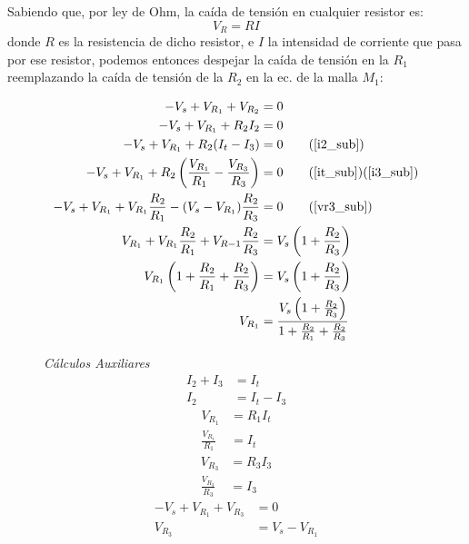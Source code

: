 \documentclass[a4paper,12pt, spanish]{report}
\begin{document}
      Sabiendo que, por ley de Ohm, la caída de tensión en cualquier resistor es:
      \begin{equation}
        V_R = R I
      \end{equation}
      donde $R$ es la resistencia de dicho resistor, e $I$ la intensidad de corriente que pasa por ese resistor,
      podemos entonces despejar la caída de tensión en la $R_1$ reemplazando la caída de tensión de la $R_2$ en la ec.
      de la malla $M_1$:
      \begin{figure}[!h]
        \centering
        \begin{minipage}{0.6\textwidth}
          \centering
          \begin{align*}
            -V_s + V_{R_1} + V_{R_2} &= 0\\
            -V_s + V_{R_1} + R_2 I_2 &= 0\\
            -V_s + V_{R_1} + R_2 (I_t - I_3) &= 0\tag*{\hfill(\ref{i2_sub})}\\
            -V_s + V_{R_1} + R_2 \left(\frac{V_{R_1}}{R_1} - \frac{V_{R_3}}{R_3}\right) &= 0\tag*{\hfill(\ref{it_sub})(\ref{i3_sub})}\\
            -V_s + V_{R_1} + V_{R_1} \frac{R_2}{R_1} - (V_s - V_{R_1}) \frac{R_2}{R_3} &= 0\tag*{\hfill(\ref{vr3_sub})}\\
            V_{R_1} + V_{R_1} \frac{R_2}{R_1} + V_{R-1} \frac{R_2}{R_3} &= V_s \left(1 + \frac{R_2}{R_3}\right)\\
            V_{R_1} \left(1 + \frac{R_2}{R_1} + \frac{R_2}{R_3}\right) &= V_s \left(1 + \frac{R_2}{R_3}\right)\\
            V_{R_1} &= \frac{V_s \left(1 + \frac{R_2}{R_3}\right)}{1 + \frac{R_2}{R_1} + \frac{R_2}{R_3}}
          \end{align*}
        \end{minipage}
        \vline
        \centering
        \begin{minipage}{0.35\textwidth}
          \centering
          \textit{Cálculos Auxiliares}
          \begin{align}
            I_2 + I_3 &= I_t\nonumber\\
            I_2 &= I_t - I_3\tag{a}
            \label{i2_sub}
          \end{align}
          \begin{align}
            V_{R_1} &= R_1 I_t\nonumber\\
            \frac{V_{R_1}}{R_1} &= I_t\tag{b}
            \label{it_sub}
          \end{align}
          \begin{align}
            V_{R_3} &= R_3 I_3\nonumber\\
            \frac{V_{R_3}}{R_3} &= I_3\tag{c}
            \label{i3_sub}
          \end{align}
          \begin{align}
            -V_s + V_{R_1} + V_{R_3} &= 0\nonumber\\
            V_{R_3} &= V_s - V_{R_1}\tag{d}
            \label{vr3_sub}
          \end{align}
        \end{minipage}
      \end{figure}
\end{document}
